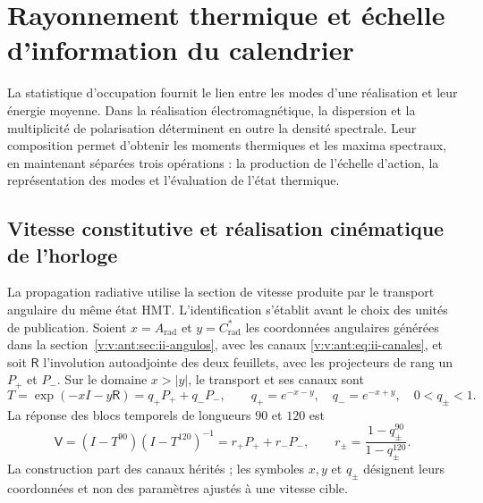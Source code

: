 \section{Rayonnement thermique et échelle d’information du calendrier}
\label{v:v:sec:radiacion-termica}

La statistique d’occupation fournit le lien entre les modes d’une
réalisation et leur énergie moyenne. Dans la réalisation électromagnétique,
la dispersion et la multiplicité de polarisation déterminent en outre la
densité spectrale. Leur composition permet d’obtenir les moments thermiques
et les maxima spectraux, en maintenant séparées trois opérations :
la production de l’échelle d’action, la représentation des modes et
l’évaluation de l’état thermique.


\subsection{Vitesse constitutive et réalisation cinématique de l’horloge}
\label{v:v:sec:enlace-velocidad-constitutiva}

La propagation radiative utilise la section de vitesse produite par le
transport angulaire du même état HMT. L’identification s’établit
avant le choix des unités de publication. Soient $x=A_{\mathrm{rad}}$ et
$y=C^*_{\mathrm{rad}}$ les coordonnées angulaires générées dans la
section~\ref{v:v:ant:sec:ii-angulos}, avec les canaux
\eqref{v:v:ant:eq:ii-canales}, et soit
$\mathsf R$ l’involution autoadjointe des deux feuillets, avec les projecteurs
de rang un $P_+$ et $P_-$. Sur le domaine $x>|y|$, le transport et ses
canaux sont
\begin{equation}
 T=\exp(-xI-y\mathsf R)=q_+P_++q_-P_-,
 \qquad q_+=e^{-x-y},\quad q_-=e^{-x+y},\quad 0<q_\pm<1.
 \label{v:v:eq:velocidad-transporte}
\end{equation}
La réponse des blocs temporels de longueurs $90$ et $120$ est
\begin{equation}
 \mathsf V=(I-T^{90})(I-T^{120})^{-1}
       =r_+P_++r_-P_-,\qquad
 r_\pm=\frac{1-q_\pm^{90}}{1-q_\pm^{120}}.
 \label{v:v:eq:velocidad-respuesta}
\end{equation}
La construction part des canaux hérités ; les symboles $x,y$ et
$q_\pm$ désignent leurs coordonnées et non des paramètres ajustés à une vitesse
cible.

